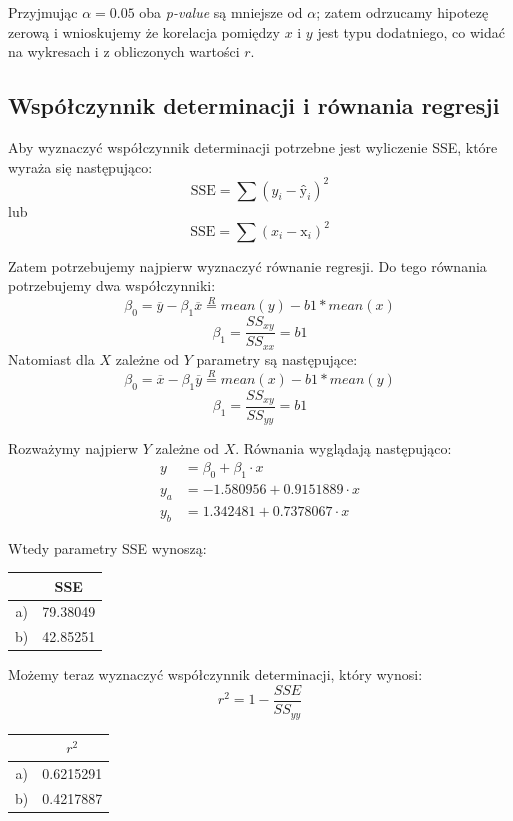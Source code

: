 \documentclass{article}
\begin{document}
Przyjmując $\alpha = 0.05$ oba \textit{p-value} są mniejsze od $\alpha$; zatem odrzucamy hipotezę zerową i wnioskujemy że korelacja pomiędzy $x$ i $y$ jest typu dodatniego, co widać na wykresach i z obliczonych wartości $r$. \\ \par

\subsection{Współczynnik determinacji i równania regresji}
Aby wyznaczyć współczynnik determinacji potrzebne jest wyliczenie SSE, które wyraża się następująco:
\[ \text{SSE} = \sum (y_i - \text{\^y}_i)^2 \]
lub
\[ \text{SSE} = \sum (x_i - \text{\^x}_i)^2 \]

Zatem potrzebujemy najpierw wyznaczyć równanie regresji. Do tego równania potrzebujemy dwa współczynniki:
\[ \beta_0 = \overline{y} - \beta_1 \overline{x} \overset{R}{=} mean(y) - b1*mean(x) \]
\[ \beta_1 = \frac{SS_{xy}}{SS_{xx}} = b1\]
Natomiast dla $X$ zależne od $Y$ parametry są następujące:
\[ \beta_0 = \overline{x} - \beta_1 \overline{y} \overset{R}{=} mean(x) - b1*mean(y) \]
\[ \beta_1 = \frac{SS_{xy}}{SS_{yy}} = b1\]

Rozważymy najpierw $Y$ zależne od $X$. Równania wyglądają następująco:
\begin{align*}
y & = \beta_0 + \beta_1 \cdot x \\
y_a & = -1.580956  +  0.9151889 \cdot x \\
y_b & = 1.342481  +  0.7378067 \cdot x
\end{align*}

Wtedy parametry SSE wynoszą:
\begin{center} \begin{tabular}{|c|c|} \hline
& SSE \\ \hline
a) & 79.38049 \\ \hline
b) & 42.85251 \\ \hline
\end{tabular} \end{center}

Możemy teraz wyznaczyć współczynnik determinacji, który wynosi:
\[ r^2 = 1 - \frac{SSE}{SS_{yy}} \]
\begin{center} \begin{tabular}{|c|c|} \hline
& $r^2$ \\ \hline
a) & 0.6215291 \\ \hline
b) & 0.4217887 \\ \hline
\end{tabular} \end{center}
\end{document}
